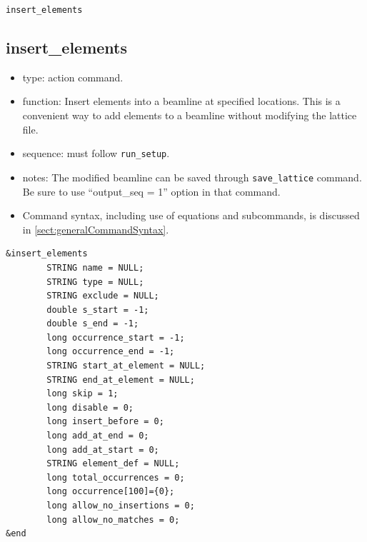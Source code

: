 \documentclass[11pt]{article}
\begin{document}
\newpage
\begin{center}{\Large\verb|insert_elements|}\end{center}
\subsection{insert\_elements \label{subsec:insertelements}}

\begin{itemize}
\item type: action command.
\item function: Insert elements into a beamline at specified locations. This is a convenient way to
 add elements to a beamline without modifying the lattice file.
\item sequence: must follow \verb|run_setup|.
\item notes: 
	The modified beamline can be saved through \verb|save_lattice|
   command. Be sure to use ``output\_seq = 1'' option in that command.  
\item Command syntax, including use of equations and subcommands, is discussed in \ref{sect:generalCommandSyntax}.
\end{itemize}

\begin{verbatim}
&insert_elements
        STRING name = NULL;
        STRING type = NULL;
        STRING exclude = NULL;
        double s_start = -1;
        double s_end = -1;
        long occurrence_start = -1;
        long occurrence_end = -1;
        STRING start_at_element = NULL;
        STRING end_at_element = NULL;
        long skip = 1;
        long disable = 0;
        long insert_before = 0;
        long add_at_end = 0;
        long add_at_start = 0;
        STRING element_def = NULL;
        long total_occurrences = 0;
        long occurrence[100]={0};
        long allow_no_insertions = 0;
        long allow_no_matches = 0;
&end
\end{verbatim}
\end{document}
